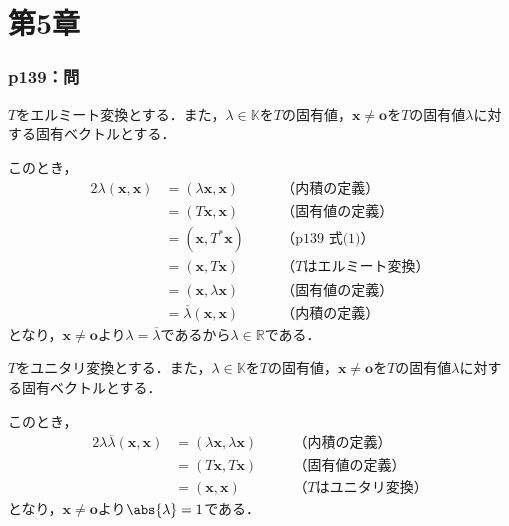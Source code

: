 

\part*{第5章}


\section*{p139：問}


\begin{tproof}
  $T$をエルミート変換とする．また，$ \lambda \in \mathbb{K}$を$T$の固有値，$\bm{x} \ne \bm{o}$を$T$の固有値$\lambda$に対する固有ベクトルとする．

  このとき，
  \begin{alignat*}{2}
    \lambda (\bm{x},\bm{x}) & = (\lambda \bm{x},\bm{x})            & \quad & \text{（内積の定義）}       \\
                            & = (T \bm{x},\bm{x})                  &       & \text{（固有値の定義）}      \\
                            & = ( \bm{x},T^{\ast} \bm{x})          &       & \text{（p139~式(1)）}   \\
                            & = ( \bm{x},T \bm{x})                 &       & \text{（$T$はエルミート変換）} \\
                            & = (\bm{x},\lambda \bm{x})            &       & \text{（固有値の定義）}      \\
                            & = \overline{\lambda} (\bm{x},\bm{x}) &       & \text{（内積の定義）}
  \end{alignat*}
  となり，$\bm{x} \ne \bm{o}$より$\lambda = \overline{\lambda}$であるから$ \lambda \in \mathbb{R}$である．
\end{tproof}

\begin{tproof}
  $T$をユニタリ変換とする．また，$ \lambda \in \mathbb{K}$を$T$の固有値，$\bm{x} \ne \bm{o}$を$T$の固有値$\lambda$に対する固有ベクトルとする．

  このとき，
  \begin{alignat*}{2}
    \lambda \overline{\lambda} (\bm{x},\bm{x}) & = (\lambda \bm{x},\lambda \bm{x}) & \quad & \text{（内積の定義）}      \\
                                               & = (T \bm{x},T \bm{x})             &       & \text{（固有値の定義）}     \\
                                               & = (\bm{x},\bm{x})                 &       & \text{（$T$はユニタリ変換）}
  \end{alignat*}
  となり，$\bm{x} \ne \bm{o}$より$\abs{\lambda} = 1$である．
\end{tproof}